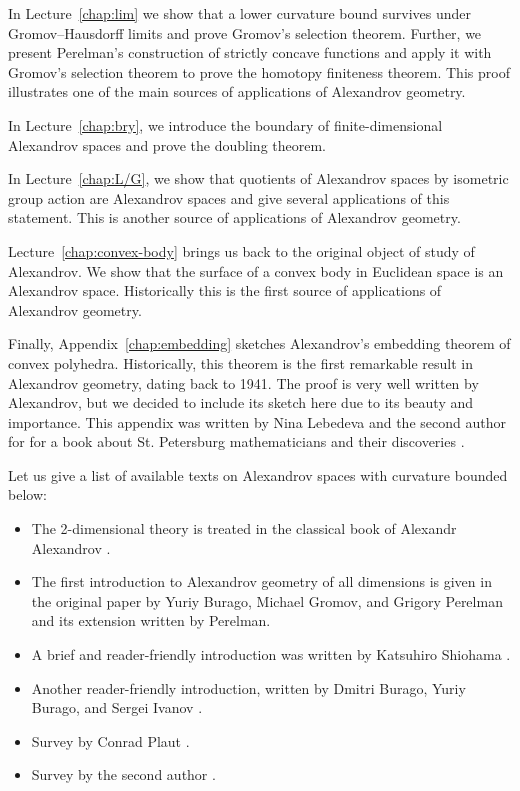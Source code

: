 In Lecture~\ref{chap:lim} we show that a lower curvature bound survives under Gromov--Hausdorff limits and prove Gromov's selection theorem.
Further, we present Perelman's construction of strictly concave functions and apply it with Gromov's selection theorem to prove the homotopy finiteness theorem.
This proof illustrates one of the main sources of applications of Alexandrov geometry.

In Lecture~\ref{chap:bry}, we introduce the boundary of finite-dimensional Alexandrov spaces and prove the doubling theorem.

In Lecture~\ref{chap:L/G}, we show that quotients of Alexandrov spaces by isometric group action are Alexandrov spaces and give several applications of this statement.
This is another source of applications of Alexandrov geometry.

Lecture~\ref{chap:convex-body} brings us back to the original object of study of Alexandrov.
We show that the surface of a convex body in Euclidean space is an Alexandrov space.
Historically this is the first source of applications of Alexandrov geometry.

Finally, Appendix~\ref{chap:embedding} sketches Alexandrov's embedding theorem of convex polyhedra.
Historically, this theorem is the first remarkable result in Alexandrov geometry, dating back to 1941.
The proof is very well written by Alexandrov, but we decided to include its sketch here due to its beauty and importance.
This appendix was written by Nina Lebedeva and the second author for  for a book about St. Petersburg mathematicians and their discoveries \cite{lebedeva-petrunin2024a}.

Let us give a list of available texts on Alexandrov spaces with curvature bounded below: 
\begin{itemize}
\item The 2-dimensional theory is treated in the classical book of Alexandr Alexandrov \cite{alexandrov-1948}.
\item The first introduction to Alexandrov geometry of all dimensions is given in the original paper by Yuriy Burago, Michael Gromov, and Grigory Perelman \cite{burago-gromov-perelman} 
and its extension \cite{perelman1991} written by Perelman.
\item A brief and reader-friendly introduction was written by Katsuhiro Shiohama \cite[Sections 1--8]{shiohama}.
\item Another reader-friendly introduction, written by Dmitri Burago, Yuriy
Burago, and Sergei Ivanov \cite[Chapter 10]{burago-burago-ivanov}.
\item Survey by Conrad Plaut \cite{plaut:survey}.
\item Survey by the second author \cite{petrunin:survey}.
\end{itemize}

